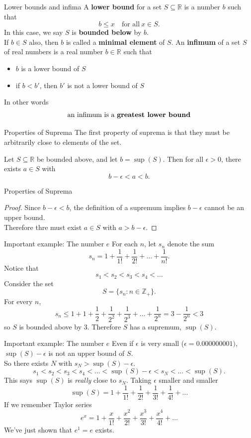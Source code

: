 \documentclass{beamer}
\begin{document}
\begin{frame}{Lower bounds and infima}
A \textbf{lower bound} for a set $S\subseteq\mathbb{R}$ is a number $b$ such that
$$b \leq x\quad\text{for all}\ x\in S.$$
\pause
In this case, we say $S$ is \textbf{bounded below} by $b$.\\
\pause
If $b\in S$ also, then $b$ is called a \textbf{minimal element} of $S$.
\pause
An \textbf{infimum} of a set $S$ of real numbers is a real number $b\in\mathbb{R}$ such that
\begin{itemize}
\item $b$ is a lower bound of $S$
\item if $b<b'$, then $b'$ is not a lower bound of $S$
\end{itemize}
\pause
In other words
$$\text{an infimum is a \bf{greatest lower bound}}$$
\end{frame}

\begin{frame}{Properties of Suprema}
The first property of suprema is that they must be arbitrarily close to elements of the set.
\begin{thm}
Let $S\subseteq\mathbb{R}$ be bounded above, and let $b = \sup(S)$.
Then for all $\epsilon > 0$, there exists $a\in S$ with
$$b-\epsilon < a < b.$$
\end{thm}
\end{frame}
\begin{frame}{Properties of Suprema}
\begin{proof}
Since $b-\epsilon < b$, the definition of a supremum implies $b-\epsilon$ cannot be an upper bound.\\
\pause
Therefore thre must exist $a\in S$ with $a > b-\epsilon$.
\end{proof}
\end{frame}

\begin{frame}{Important example: The number $e$}
For each $n$, let $s_n$ denote the sum
$$s_n = 1 + \frac{1}{1!} + \frac{1}{2!} + \dots + \frac{1}{n!}.$$
\pause
Notice that
$$s_1 < s_2 < s_3 < s_4 < \dots$$
\pause
Consider the set
$$S = \{ s_n: n\in\mathbb{Z}_+\}.$$
\pause
For every $n$, 
$$s_n \leq 1 + 1 + \frac{1}{2} + \frac{1}{2^2} + \frac{1}{2^3} + \dots + \frac{1}{2^n} = 3 - \frac{1}{2^{n}} < 3$$
so $S$ is bounded above by $3$.
\pause
Therefore $S$ has a supremum, $\sup(S)$.
\end{frame}

\begin{frame}{Important example: The number $e$}
Even if $\epsilon$ is very small ($\epsilon = 0.000000001)$, $\sup(S)-\epsilon$ is not an upper bound of $S$.\\
\pause
So there exists $N$ with $s_N > \sup(S)-\epsilon$.
\pause
$$s_1 < s_2 < s_3 < s_4 < \dots < \sup(S)-\epsilon < s_N < \dots < \sup(S).$$
\pause
This says $\sup(S)$ is \emph{really} close to $s_N$.
\pause
Taking $\epsilon$ smaller and smaller
\pause
$$\sup(S) = 1 + \frac{1}{1!} + \frac{1}{2!} + \frac{1}{3!} + \frac{1}{4!}  + \dots$$
\pause
If we remember Taylor series
\pause
$$e^x = 1 + \frac{x}{1!} + \frac{x^2}{2!} + \frac{x^3}{3!} + \frac{x^4}{4!}  + \dots$$
\pause
We've just shown that $e^1=e$ exists.
\end{frame}
\end{document}
